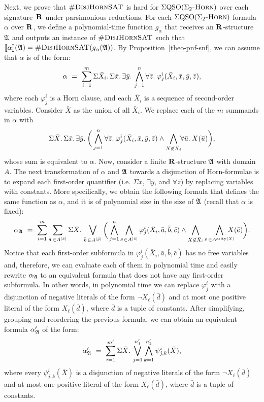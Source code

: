 Next, we prove that $\textsc{\#DisjHornSAT}$ is hard for $\Sigma{\rm QSO}(\Sigma_2\textsc{-Horn})$ over each signature~$\mathbf{R}$ under parsimonious reductions. For each $\Sigma{\rm QSO}(\Sigma_2\textsc{-Horn})$ formula $\alpha$ over $\mathbf{R}$, we define a polynomial-time function $g_{\alpha}$ that receives an $\mathbf{R}$-structure $\mathfrak{A}$ and outputs an instance of $\textsc{\#DisjHornSAT}$ such that ${\llbracket{}{\alpha}\rrbracket}(\mathfrak{A}) = \textsc{\#DisjHornSAT}(g_{\alpha}(\mathfrak{A}))$. By Proposition~\ref{theo-pnf-snf}, we can assume that $\alpha$ is of the form:
$$
\alpha \ = \ \sum_{i = 1}^{m} \Sigma{\bar{X}_{i}}.\,\Sigma{\bar{x}}.\, \exists{\bar{y}}.\: \bigwedge_{j = 1}^{n} \forall{\bar{z}}.\: \varphi^i_j(\bar{X}_{i},\bar{x},\bar{y},\bar{z}),
$$
where each $\varphi^i_j$ is a Horn clause, and each $\bar{X}_{i}$ is a sequence of second-order variables.
Consider $\bar{X}$ as the union of all $\bar{X}_{i}$. We replace each of the $m$ summands in $\alpha$ with
$$
\Sigma{\bar{X}}.\,\Sigma{\bar{x}}.\, \exists{\bar{y}}.\: \bigg( \bigwedge_{j = 1}^{n} \forall{\bar{z}}.\: \varphi^i_j(\bar{X}_{i},\bar{x},\bar{y},\bar{z})\wedge\bigwedge_{X\not\in\bar{X}_{i}}\!\!\forall{\bar{u}}.\:X(\bar{u})\bigg),
$$
whose sum is equivalent to $\alpha$.
Now, consider a finite $\mathbf{R}$-structure $\mathfrak{A}$ with domain $A$. 
The next transformation of $\alpha$ and $\mathfrak{A}$ towards a disjunction of Horn-formulae is to expand each first-order quantifier (i.e. $\Sigma{\bar{x}}$,  $\exists\bar{y}$, and $\forall\bar{z}$) by replacing variables with constants.
More specifically, we obtain the following formula that defines the same function as $\alpha$, and it is of polynomial size in the size of $\mathfrak{A}$ (recall that $\alpha$ is fixed):
$$
\alpha_{\mathfrak{A}} \ = \ \sum_{i = 1}^{m} \sum_{\bar{a}\,\in A^{\vert \bar{x} \vert}} \Sigma{\bar{X}}.\,\bigvee_{\bar{b}\,\in A^{\vert \bar{y} \vert}}\bigg(\bigwedge_{j = 1}^n\bigwedge_{\bar{c}\,\in A^{\vert \bar{z} \vert}}\varphi^i_j(\bar{X}_i,\bar{a},\bar{b},\bar{c})\wedge \bigwedge_{X \not\in \bar{X}_i}\bigwedge_{\bar{e}\,\in A^{{\rm arity}(X)}}\!\!\!\!\!\!\! X(\bar{e})\bigg).
$$
Notice that each first-order subformula in $\varphi^i_j(\bar{X}_i,\bar{a},\bar{b},\bar{c})$ has no free variables and, therefore, we can evaluate each of them in polynomial time and easily rewrite $\alpha_{\mathfrak{A}}$ to an equivalent formula that does not have any first-order subformula. In other words, in polynomial time we can replace $\varphi^i_j$ with a disjunction of negative literals of the form $\neg X_{\ell}(\bar d)$ and at most one positive literal of the form $X_{\ell}(\bar d)$, where $\bar d$ is a tuple of constants. After simplifying, grouping and reordering the previous formula, we can obtain an equivalent formula $\alpha_{\mathfrak{A}}'$ of the form:
$$
\alpha_{\mathfrak{A}}' \ = \ \sum_{i = 1}^{m'}\Sigma{\bar{X}}.\,\bigvee_{j = 1}^{n_1'}\bigwedge_{k = 1}^{n_2'}\psi^{i}_{j,k}(\bar{X}),
$$
where every $\psi^{i}_{j,k}(\bar{X})$ is a disjunction of 
negative literals of the form $\neg X_{\ell}(\bar d)$ and at most one positive literal of the form $X_{\ell}(\bar d)$, where $\bar d$ is a tuple of constants. 

